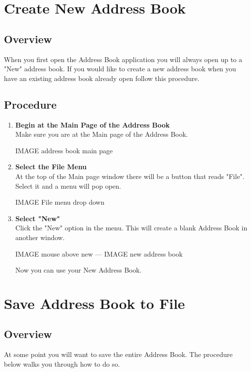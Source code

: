 \documentclass[a4paper, 11pt]{article}
\newlength{\drop}
\begin{document}
\section{Create New Address Book}
\subsection{Overview}
When you first open the Address Book application you will always open up to a "New" address book. If you would like to create a new address book when you have an existing address book already open follow this procedure. 
\subsection{Procedure}
\begin{enumerate}[label=\textbf{\arabic*})]
    \item{\textbf{Begin at the Main Page of the Address Book}}\\ Make sure you are at the Main page of the Address Book.
    
    IMAGE address book main page
    
    \item{\textbf{Select the File Menu}}\\ At the top of the Main page window there will be a button that reads "File". Select it and a menu will pop open.
    
    IMAGE File menu drop down  
    
    \item{\textbf{Select "New"}}\\ Click the "New" option in the menu. This will create a blank Address Book in another window.
    
    IMAGE mouse above new --- IMAGE new address book 
    
    Now you can use your New Address Book.
\end{enumerate}

\section{Save Address Book to File}
\subsection{Overview}
At some point you will want to save the entire Address Book. The procedure below walks you through how to do so.
\end{document}
